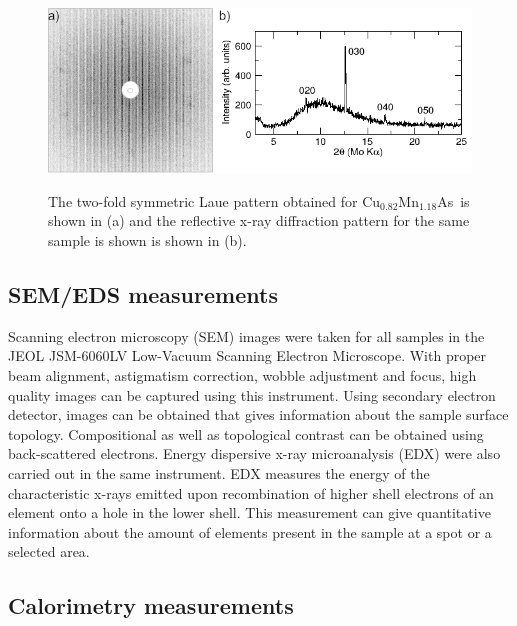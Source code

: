 \documentclass[10pt,doublespacing,edeposit]{uiucthesis2020}
\newcommand*{\cumnas}{Cu$_{0.82}$Mn$_{1.18}$As}
\begin{document}
\begin{mainmatter}

\begin{figure}
\centering\includegraphics[width=\columnwidth]{figures/ch3/hex_CuMnAs_alignment.png} \\
\caption{\label{fig:hex_CuMnAs_alignment}
The two-fold symmetric Laue pattern obtained for \cumnas\ is shown in (a) and the reflective x-ray diffraction pattern for the same sample is shown is shown in (b).
}
\end{figure}

\subsection{SEM/EDS measurements}

Scanning electron microscopy (SEM) images were taken for all samples in the JEOL JSM-6060LV Low-Vacuum Scanning Electron Microscope. With proper beam alignment, astigmatism correction, wobble adjustment and focus, high quality images can be captured using this instrument. Using secondary electron detector, images can be obtained that gives information about the sample surface topology. Compositional as well as topological contrast can be obtained using back-scattered electrons. Energy dispersive x-ray microanalysis (EDX) were also carried out in the same instrument. EDX measures the energy of the characteristic x-rays emitted upon recombination of higher shell electrons of an element onto a hole in the lower shell.	This measurement can give quantitative information about the amount of elements present in the sample at a spot or a selected area.

\subsection{Calorimetry measurements}



\end{mainmatter}
\end{document}
